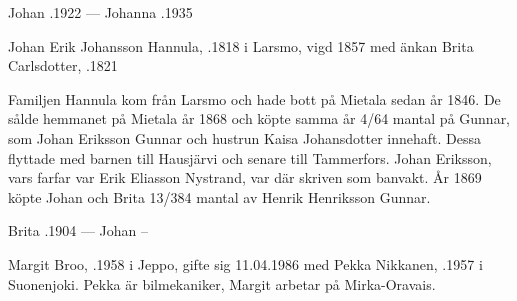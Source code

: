 Johan .1922  ---  Johanna .1935


Johan Erik Johansson Hannula, .1818 i Larsmo, vigd 1857 med änkan Brita Carlsdotter, .1821
\begin{jhchildren}
  \item {}
  \item {}
  \item {}
  \item {}
  \item {}
\end{jhchildren}

Familjen Hannula kom från Larsmo och hade bott på Mietala sedan år 1846. De sålde hemmanet på Mietala år 1868 och köpte samma år 4/64 mantal på Gunnar, som Johan Eriksson Gunnar och hustrun Kaisa Johansdotter innehaft. Dessa flyttade med barnen till Hausjärvi och senare till Tammerfors. Johan Eriksson, vars farfar var Erik Eliasson Nystrand, var där skriven som banvakt. År 1869 köpte Johan och Brita 13/384 mantal av Henrik Henriksson Gunnar.

Brita .1904  ---  Johan --






Margit Broo, .1958 i Jeppo, gifte sig 11.04.1986 med Pekka Nikkanen, .1957 i Suonenjoki. Pekka är bilmekaniker, Margit arbetar på Mirka-Oravais.
\begin{jhchildren}
  \item {}
  \item {}
\end{jhchildren}

